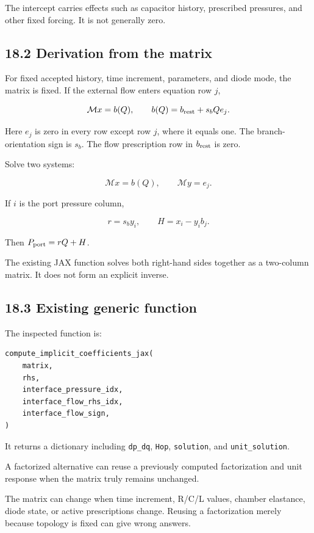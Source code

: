 \documentclass[11pt,a4paper]{article}
\begin{document}
The intercept carries effects such as capacitor history, prescribed pressures, and other fixed forcing. It is not generally zero.

\subsection{18.2 Derivation from the matrix}
For fixed accepted history, time increment, parameters, and diode mode, the matrix is fixed. If the external flow enters equation row \(j\),


\begingroup\small
\[
\mathcal Mx=b(Q),
\qquad
b(Q)=b_{\rm rest}+s_bQe_j.
\]
\endgroup


Here \(e_j\) is zero in every row except row \(j\), where it equals one. The branch-orientation sign is \(s_b\). The flow prescription row in \(b_{\rm rest}\) is zero.

Solve two systems:


\begingroup\small
\[
\mathcal Mx=b(Q),\qquad \mathcal My=e_j.
\]
\endgroup


If \(i\) is the port pressure column,


\begingroup\small
\[
r=s_by_i,\qquad
H=x_i-y_i b_j.
\]
\endgroup


Then \(P_{\rm port}=rQ+H\).

The existing JAX function solves both right-hand sides together as a two-column matrix. It does not form an explicit inverse.

\subsection{18.3 Existing generic function}
The inspected function is:


\begin{lstlisting}
compute_implicit_coefficients_jax(
    matrix,
    rhs,
    interface_pressure_idx,
    interface_flow_rhs_idx,
    interface_flow_sign,
)
\end{lstlisting}
It returns a dictionary including \texttt{dp\_\allowbreak{}dq}, \texttt{Hop}, \texttt{solution}, and \texttt{unit\_\allowbreak{}solution}.

A factorized alternative can reuse a previously computed factorization and unit response when the matrix truly remains unchanged.

The matrix can change when time increment, R/C/L values, chamber elastance, diode state, or active prescriptions change. Reusing a factorization merely because topology is fixed can give wrong answers.
\end{document}

